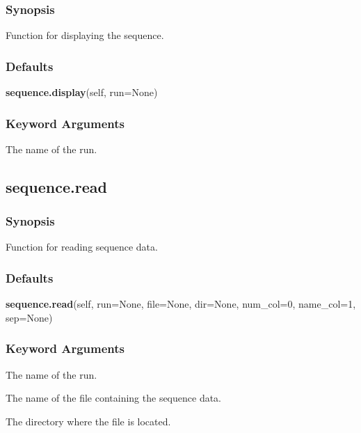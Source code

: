 \subsubsection{Synopsis}

Function for displaying the sequence.



\subsubsection{Defaults}

\textsf{\textbf{sequence.display}(self, run=None)}


\subsubsection{Keyword Arguments}

  The name of the run. 





\newpage

\subsection{sequence.read}


\subsubsection{Synopsis}

Function for reading sequence data.



\subsubsection{Defaults}

\textsf{\textbf{sequence.read}(self, run=None, file=None, dir=None, num\_col=0, name\_col=1, sep=None)}


\subsubsection{Keyword Arguments}

  The name of the run. 

  The name of the file containing the sequence data. 

  The directory where the file is located. 


